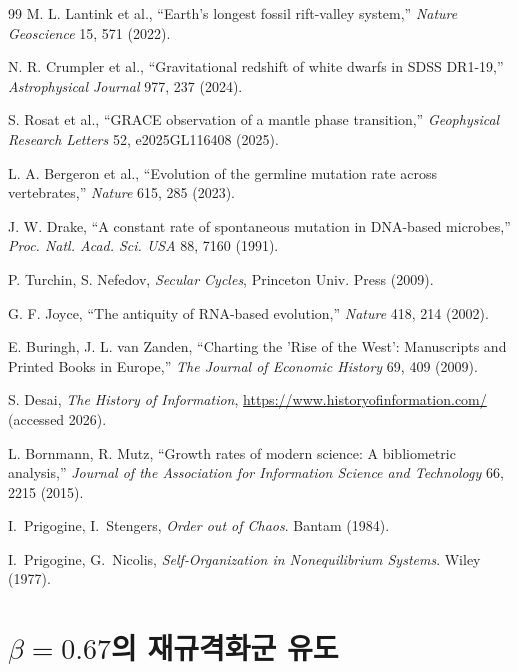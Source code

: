 \documentclass[12pt,a4paper]{article}
\theoremstyle{remark}
\begin{document}
\begin{thebibliography}{99}
		M. L. Lantink et al., ``Earth's longest fossil rift-valley system,'' \emph{Nature Geoscience} 15, 571 (2022).
		
		N. R. Crumpler et al., ``Gravitational redshift of white dwarfs in SDSS DR1-19,'' \emph{Astrophysical Journal} 977, 237 (2024).
		
		S. Rosat et al., ``GRACE observation of a mantle phase transition,'' \emph{Geophysical Research Letters} 52, e2025GL116408 (2025).
		
		L. A. Bergeron et al., ``Evolution of the germline mutation rate across vertebrates,'' \emph{Nature} 615, 285 (2023).
		
		J. W. Drake, ``A constant rate of spontaneous mutation in DNA-based microbes,'' \textit{Proc. Natl. Acad. Sci. USA} 88, 7160 (1991).
		
		P. Turchin, S. Nefedov, \emph{Secular Cycles}, Princeton Univ. Press (2009).
		
		G. F. Joyce, ``The antiquity of RNA-based evolution,'' \textit{Nature} 418, 214 (2002).
		
		E. Buringh, J. L. van Zanden, ``Charting the 'Rise of the West': Manuscripts and Printed Books in Europe,'' \emph{The Journal of Economic History} 69, 409 (2009).
		
		S. Desai, \emph{The History of Information}, \url{https://www.historyofinformation.com/} (accessed 2026).
		
		L. Bornmann, R. Mutz, ``Growth rates of modern science: A bibliometric analysis,'' \emph{Journal of the Association for Information Science and Technology} 66, 2215 (2015).
		
		 I.~Prigogine, I.~Stengers, \emph{Order out of Chaos}. Bantam (1984).
		
		 I.~Prigogine, G.~Nicolis, \emph{Self‑Organization in Nonequilibrium Systems}. Wiley (1977).
		
	\end{thebibliography}
	
	\appendix
	
	\section{\(\beta = 0.67\)의 재규격화군 유도}
	\label{app:rg}
	
\end{document}

